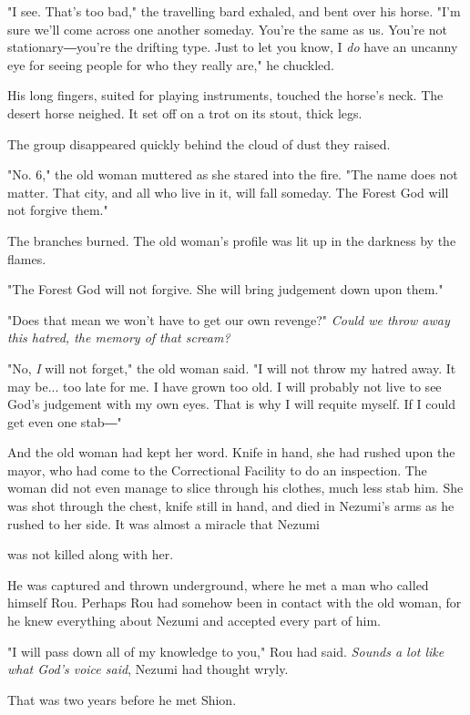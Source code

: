"I see. That's too bad," the travelling bard exhaled, and bent over his
horse. "I'm sure we'll come across one another someday. You're the same
as us. You're not stationary―you're the drifting type. Just to let you
know, I \emph{do} have an uncanny eye for seeing people for who they really
are," he chuckled.

His long fingers, suited for playing instruments, touched the horse's
neck. The desert horse neighed. It set off on a trot on its stout, thick
legs.

The group disappeared quickly behind the cloud of dust they raised.

"No. 6," the old woman muttered as she stared into the fire. "The name
does not matter. That city, and all who live in it, will fall someday.
The Forest God will not forgive them."

The branches burned. The old woman's profile was lit up in the darkness
by the flames.

"The Forest God will not forgive. She will bring judgement down upon
them."

"Does that mean we won't have to get our own revenge?" \emph{Could we throw
away this hatred, the memory of that scream?}

"No, \emph{I} will not forget," the old woman said. "I will not throw my hatred
away. It may be... too late for me. I have grown too old. I will
probably not live to see God's judgement with my own eyes. That is why I
will requite myself. If I could get even one stab―"

And the old woman had kept her word. Knife in hand, she had rushed upon
the mayor, who had come to the Correctional Facility to do an
inspection. The woman did not even manage to slice through his clothes,
much less stab him. She was shot through the chest, knife still in hand,
and died in Nezumi's arms as he rushed to her side. It was almost a
miracle that Nezumi~

was not killed along with her.

He was captured and thrown underground, where he met a man who called
himself Rou. Perhaps Rou had somehow been in contact with the old woman,
for he knew everything about Nezumi and accepted every part of him.

"I will pass down all of my knowledge to you," Rou had said. \emph{Sounds a
lot like what God's voice said}, Nezumi had thought wryly.

That was two years before he met Shion.

\myspace

